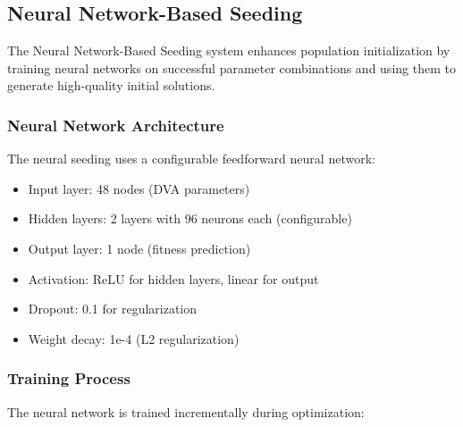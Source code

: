 \documentclass[12pt,a4paper]{article}
\begin{document}
\subsection{Neural Network-Based Seeding}

The Neural Network-Based Seeding system enhances population initialization by training neural networks on successful parameter combinations and using them to generate high-quality initial solutions.

\subsubsection{Neural Network Architecture}

The neural seeding uses a configurable feedforward neural network:

\begin{itemize}
    \item Input layer: 48 nodes (DVA parameters)
    \item Hidden layers: 2 layers with 96 neurons each (configurable)
    \item Output layer: 1 node (fitness prediction)
    \item Activation: ReLU for hidden layers, linear for output
    \item Dropout: 0.1 for regularization
    \item Weight decay: 1e-4 (L2 regularization)
\end{itemize}

\subsubsection{Training Process}

The neural network is trained incrementally during optimization:
\end{document}
